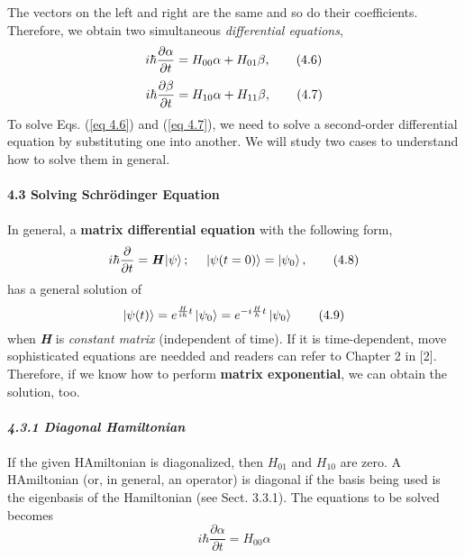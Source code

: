 \documentclass{article}
\begin{document}
The vectors on the left and right are the same and so do their coefficients. 
Therefore, we obtain two simultaneous \textit{differential equations},
\begin{equation} \label{eq 4.6}
        i\hbar\frac{\partial\alpha}{\partial t}= H_{00}\alpha+H_{01}\beta,\\\tag{4.6}
        \end{equation}
        \begin{equation} \label{eq 4.7}
        i\hbar\frac{\partial\beta}{\partial t}= H_{10}\alpha+H_{11}
        \beta,\\ \tag{4.7}
\end{equation}
To solve Eqs. (\ref{eq 4.6}) and (\ref{eq 4.7}), we need to solve a second-order differential equation
by substituting one into another. We will study two cases to understand how to solve them in general.
\\\\
\textbf{\large 4.3 Solving Schr\"{o}dinger Equation}
\\\\
In general, a \textbf{matrix differential equation} with the following form,
\begin{equation} \label{eq 4.8}
    i\hbar\frac{\partial}{\partial t}= \textit{\textbf{H}}\ket{\psi}; \ \ \ \   \ket{\psi(t=0)}=\ket{\psi_0},\tag{4.8}
\end{equation}
has a general solution of 
\begin{equation} \label{eq 4.9}
    \ket{\psi(t)}=e^{\frac{H}{ih}t}\ket{\psi_0}=e^{-i\frac{H}{h}t}\ket{\psi_0} \tag{4.9}
\end{equation}
when \textit{\textbf{H}} is \textit{constant matrix} (independent of time).
If it is time-dependent, move sophisticated equations are needded and readers can refer to Chapter 2 in
[2]. Therefore, if we know how to perform \textbf{matrix exponential}, we can
obtain the solution, too.
\\\\
\textbf{\textit{\large 4.3.1 Diagonal Hamiltonian}}\\
\\
If the given HAmiltonian is diagonalized, then $H_{01}$ and $H_{10}$ are zero.
A HAmiltonian (or, in general, an operator) is diagonal if the basis being used is the eigenbasis of
the Hamiltonian (see Sect. 3.3.1). The equations to be solved becomes
\begin{equation} \label{eq 4.10}
    i\hbar\frac{\partial\alpha}{\partial t}= H_{00}\alpha\tag{4.10}
\end{equation}
\end{document}
